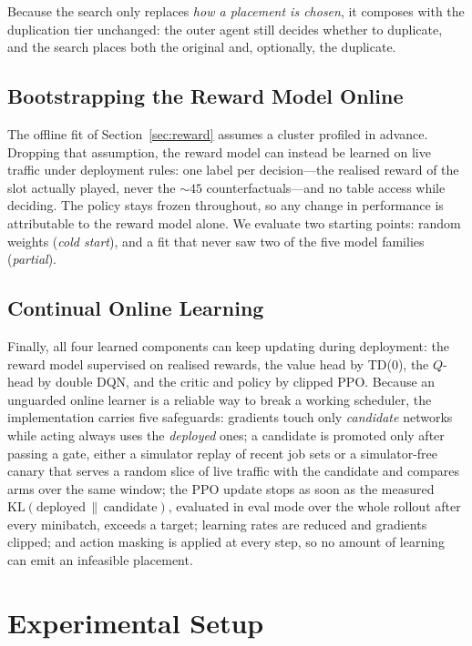 \documentclass{article}
\begin{document}
Because the search only replaces \emph{how a placement is chosen}, it composes
with the duplication tier unchanged: the outer agent still decides whether to
duplicate, and the search places both the original and, optionally, the duplicate.

\subsection{Bootstrapping the Reward Model Online}
\label{sec:online-method}

The offline fit of Section~\ref{sec:reward} assumes a cluster profiled in advance.
Dropping that assumption, the reward model can instead be learned on live traffic
under deployment rules: one label per decision---the realised reward of the slot
actually played, never the ${\sim}45$ counterfactuals---and no table access while
deciding. The policy stays frozen throughout, so any change in performance is
attributable to the reward model alone. We evaluate two starting points: random
weights (\emph{cold start}), and a fit that never saw two of the five model
families (\emph{partial}).

\subsection{Continual Online Learning}
\label{sec:online-learning}

Finally, all four learned components can keep updating during deployment: the
reward model supervised on realised rewards, the value head by TD(0), the $Q$-head
by double DQN, and the critic and policy by clipped PPO. Because an unguarded
online learner is a reliable way to break a working scheduler, the implementation
carries five safeguards: gradients touch only \emph{candidate} networks while
acting always uses the \emph{deployed} ones; a candidate is promoted only after
passing a gate, either a simulator replay of recent job sets or a simulator-free
canary that serves a random slice of live traffic with the candidate and compares
arms over the same window; the PPO update stops as soon as the measured
$\mathrm{KL}(\text{deployed} \,\|\, \text{candidate})$, evaluated in eval mode over
the whole rollout after every minibatch, exceeds a target; learning rates are
reduced and gradients clipped; and action masking is applied at every step, so no
amount of learning can emit an infeasible placement.

\section{Experimental Setup}
\end{document}
